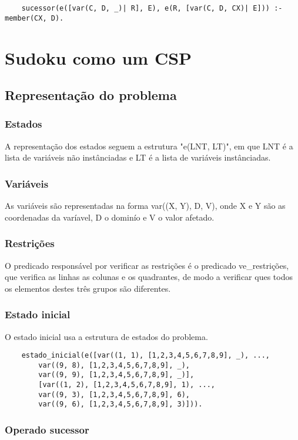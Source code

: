 \documentclass{article}
\begin{document}
\begin{verbatim}
    sucessor(e([var(C, D, _)| R], E), e(R, [var(C, D, CX)| E])) :- member(CX, D).
\end{verbatim}

\newpage
\section{Sudoku como um CSP}
\subsection{Representação do problema}
\subsubsection{Estados}
A representação dos estados seguem a estrutura "e(LNT, LT)", em que LNT é a lista de variáveis não instânciadas e LT é a lista de variáveis instânciadas.

\subsubsection{Variáveis}
As variáveis são representadas na forma var((X, Y), D, V), onde X e Y são as coordenadas da varíavel, D o dominío e V o valor afetado.

\subsubsection{Restrições}
O predicado responsável por verificar as restrições é o predicado ve\_restrições, que verifica as linhas as colunas e os quadrantes, de modo a verificar ques todos os elementos destes três grupos são diferentes.

\subsubsection{Estado inicial}
O estado inicial usa a estrutura de estados do problema.

\begin{verbatim}
    estado_inicial(e([var((1, 1), [1,2,3,4,5,6,7,8,9], _), ..., 
        var((9, 8), [1,2,3,4,5,6,7,8,9], _), 
        var((9, 9), [1,2,3,4,5,6,7,8,9], _)],
        [var((1, 2), [1,2,3,4,5,6,7,8,9], 1), ..., 
        var((9, 3), [1,2,3,4,5,6,7,8,9], 6), 
        var((9, 6), [1,2,3,4,5,6,7,8,9], 3)])).
\end{verbatim}

\subsubsection{Operado sucessor}
\end{document}
